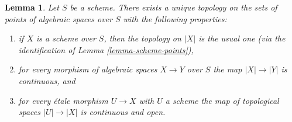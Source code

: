 \documentclass{stacks-project}
\theoremstyle{plain}
\newtheorem{lemma}[subsection]{Lemma}
\theoremstyle{definition}
\theoremstyle{remark}
\numberwithin{equation}{subsection}
\begin{document}
\begin{lemma}
\label{lemma-topology-points}
Let $S$ be a scheme. There exists a unique topology on the sets of points
of algebraic spaces over $S$ with the following properties:
\begin{enumerate}
\item if $X$ is a scheme over $S$, then the topology on $|X|$ is the usual one
(via the identification of Lemma \ref{lemma-scheme-points}),
\item for every morphism of algebraic spaces $X \to Y$ over $S$
the map $|X| \to |Y|$ is continuous, and
\item for every \'etale morphism $U \to X$ with $U$ a scheme
the map of topological spaces $|U| \to |X|$ is continuous and open.
\end{enumerate}
\end{lemma}
\end{document}
